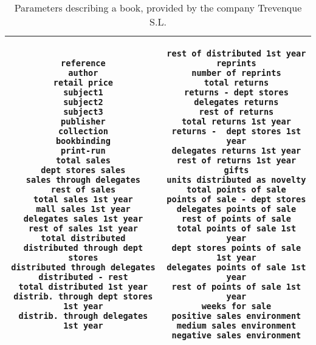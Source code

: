 \documentclass[a4paper,10pt,twocolumn,preprint,3p]{elsarticle}
\begin{document}
\begin{table*}[!ht]
\caption{Parameters describing a book, provided by the company Trevenque S.L.}
\label{tabla:paramsOrig50}
\begin{center}
\begin{tabular}{|c|c|}
\hline 

\begin{minipage}{2.45in}\begin{small}
 \begin{verbatim}
reference
author
retail price
subject1
subject2
subject3
publisher
collection
bookbinding
print-run
total sales
dept stores sales
sales through delegates
rest of sales
total sales 1st year
mall sales 1st year
delegates sales 1st year
rest of sales 1st year
total distributed
distributed through dept stores
distributed through delegates
distributed - rest
total distributed 1st year
distrib. through dept stores 1st year
distrib. through delegates 1st year
\end{verbatim}
\end{small} \end{minipage}     & 

\begin{minipage}{2.3in} \begin{small}
\begin{verbatim}
rest of distributed 1st year
reprints
number of reprints
total returns
returns - dept stores
delegates returns
rest of returns
total returns 1st year
returns -  dept stores 1st year
delegates returns 1st year
rest of returns 1st year
gifts
units distributed as novelty
total points of sale
points of sale - dept stores
delegates points of sale
rest of points of sale
total points of sale 1st year
dept stores points of sale 1st year
delegates points of sale 1st year
rest of points of sale 1st year
weeks for sale
positive sales environment
medium sales environment
negative sales environment
\end{verbatim}
\end{small} \end{minipage}    \\

\hline
\end{tabular}
\end{center}
\end{table*}
\end{document}

